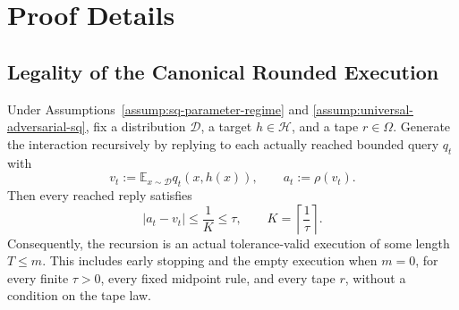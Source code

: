 \appendix

\section{Proof Details}
\label{sec:proof-details}

\subsection{Legality of the Canonical Rounded Execution}
\label{app:step-001}

\begin{lemma}
\label{lem:step-001-canonical-validity}
Under Assumptions~\ref{assump:sq-parameter-regime} and
\ref{assump:universal-adversarial-sq}, fix a distribution \(\mathcal D\), a
target \(h\in\mathcal H\), and a tape \(r\in\Omega\).  Generate the
interaction recursively by replying to each actually reached bounded query
\(q_t\) with
\[
v_t:=\mathbb E_{x\sim\mathcal D}q_t(x,h(x)),
\qquad
a_t:=\rho(v_t).
\]
Then every reached reply satisfies
\[
|a_t-v_t|\le\frac{1}{K}\le\tau,
\qquad
K=\left\lceil\frac{1}{\tau}\right\rceil.
\]
Consequently, the recursion is an actual tolerance-valid execution of some
length \(T\le m\).  This includes early stopping and the empty execution when
\(m=0\), for every finite \(\tau>0\), every fixed midpoint rule, and every
tape \(r\), without a condition on the tape law.
\end{lemma}

